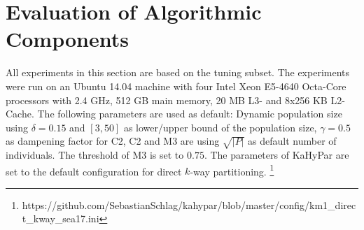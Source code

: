 \documentclass[a4paper,12pt,titlepage, BCOR7mm,headsepline]{scrbook}
\numberwithin{equation}{section}
\begin{document}
\section{Evaluation of Algorithmic Components} 
All experiments in this section are based on the tuning subset. The experiments were run on an Ubuntu 14.04 machine with four Intel Xeon E5-4640 Octa-Core processors  with 2.4 GHz, 512 GB main memory, 20 MB L3- and 8x256 KB L2-Cache. The following parameters are used as default: Dynamic population size using $\delta = 0.15$ and $[3,50]$ as lower/upper bound of the population size, $\gamma = 0.5$ as dampening factor for C2, C2 and M3 are using $\sqrt{|P|}$ as default number of individuals. The threshold of M3 is set to $0.75$. The parameters of KaHyPar are set to the default configuration for direct $k$-way partitioning. \footnote{https://github.com/SebastianSchlag/kahypar/blob/master/config/km1\_direct\_kway\_sea17.ini}
\end{document}
